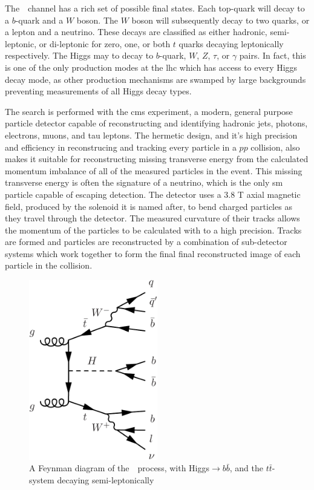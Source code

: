 \par The~\ttH~channel has a rich set of possible final states.  Each top-quark will decay to a $b$-quark and a $W$ boson.  The $W$ boson will subsequently decay to two quarks, or a lepton and a neutrino.  These decays are classified as either hadronic, semi-leptonic, or di-leptonic for zero, one, or both $t$ quarks decaying leptonically 
respectively.  The Higgs may to decay to $b$-quark, $W$, $Z$, $\tau$, or $\gamma$ pairs.  In fact, this is one of the only production modes at the \acrshort{lhc} which 
has access to every Higgs decay mode, as other production mechanisms are swamped by large backgrounds preventing measurements of all Higgs decay types.  

\par The search is performed with the \acrshort{cms} experiment, a modern, general purpose particle detector capable of reconstructing and identifying hadronic jets, photons, electrons, muons, and tau leptons.  The hermetic design, and it's high precision and efficiency in reconstrucing and tracking every particle in a $pp$ collision, also makes it suitable for reconstructing missing transverse energy from the calculated momentum imbalance of all of the measured particles in the event.  This missing transverse energy is often the signature of a neutrino, which is the only \acrshort{sm} particle capable of escaping detection.  The detector uses a 3.8 T axial magnetic field, produced by the solenoid it is named after, to bend charged particles as they travel through the detector.  The measured curvature of their tracks allows the momentum of the particles to be calculated with to a high precision.  Tracks are formed and particles are reconstructed by a combination of sub-detector systems which work together to form the final final reconstructed image of each particle in the collision.  

\begin{figure}[h]
   \centering
  \includegraphics[width=0.5\textwidth]{Figures/Feynman_Diagrams/higgs_production__tth_semileptonic.pdf}
  \caption{A Feynman diagram of the~\ttH~process, with Higgs$\rightarrow$$b\bar{b}$, and the $t\bar{t}$-system decaying semi-leptonically} \label{fd:ttH_semiLep}
\end{figure}

